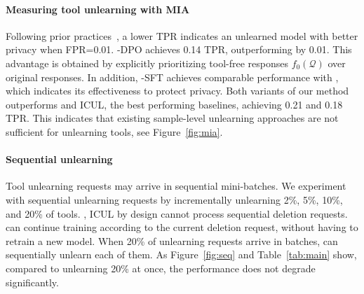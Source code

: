 \paragraph{Measuring tool unlearning with MIA}
Following prior practices~\citep{lira,icul}, a lower TPR indicates an unlearned model with better privacy when FPR=0.01. \method-DPO achieves 0.14 TPR, outperforming \RET by 0.01. This advantage is obtained by explicitly prioritizing tool-free responses $f_0(\mathcal{Q})$ over original responses. In addition, \method-SFT achieves comparable performance with \RET, which indicates its effectiveness to protect privacy. Both variants of our method outperforms \GA and ICUL, the best performing %
baselines, achieving 0.21 and 0.18 TPR. This indicates that existing sample-level unlearning approaches are not sufficient for unlearning tools, see Figure~\ref{fig:mia}.


\paragraph{Sequential unlearning}
Tool unlearning requests may arrive in sequential mini-batches. We experiment with sequential unlearning requests by incrementally unlearning 2\%, 5\%, 10\%, and 20\% of tools. \RET, ICUL by design cannot process sequential deletion requests. \method can continue training according to the current deletion request, without having to retrain a new model. When 20\% of unlearning requests arrive in batches, \method can sequentially unlearn each of them. As Figure~\ref{fig:seq} and Table~\ref{tab:main} show, compared to unlearning 20\% at once, the performance does not degrade significantly. 



